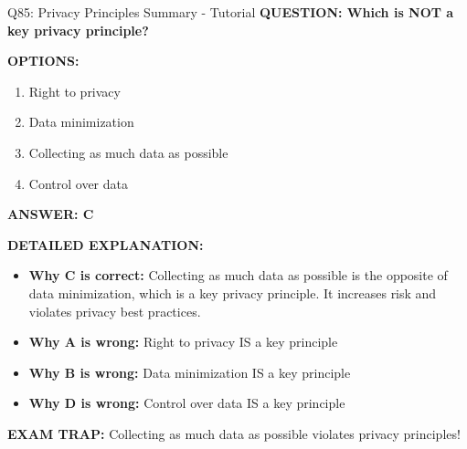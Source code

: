 \documentclass[8pt]{beamer}
\begin{document}
	\begin{frame}{Q85: Privacy Principles Summary - Tutorial}
		\fontsize{6.5}{7.5}\selectfont
		\textbf{QUESTION: Which is NOT a key privacy principle?}
		
		\vspace{0.1cm}
		\textbf{OPTIONS:}
		\begin{enumerate}
			\item Right to privacy
			\item Data minimization
			\item Collecting as much data as possible
			\item Control over data
		\end{enumerate}
		
		\vspace{0.1cm}
		\textcolor{myblue}{\textbf{ANSWER: C}}
		
		\vspace{0.1cm}
		\textbf{DETAILED EXPLANATION:}
		\begin{itemize}
			\item \textbf{Why C is correct:} Collecting as much data as possible is the opposite of data minimization, which is a key privacy principle. It increases risk and violates privacy best practices.
			\item \textbf{Why A is wrong:} Right to privacy IS a key principle
			\item \textbf{Why B is wrong:} Data minimization IS a key principle
			\item \textbf{Why D is wrong:} Control over data IS a key principle
		\end{itemize}
		
		\textcolor{myred}{\textbf{EXAM TRAP:}} Collecting as much data as possible \textcolor{myblue}{violates privacy principles}!
	\end{frame}
	
	
\end{document}
